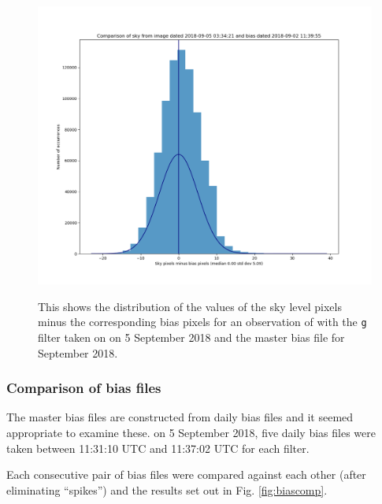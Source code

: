 \begin{figure}[!htbp]
\begin{center}
\includegraphics[scale=0.5]{images/negbiaseg.png}
\end{center}   
\caption{This shows the distribution of the values of the sky level pixels minus
the corresponding bias pixels for an observation of {\bstar} with the \texttt{g}
filter taken on on 5 September 2018 and the master bias file for September 2018.}
\protect\label{fig:negbiaseg}
\end{figure}

\subsubsection{Comparison of bias files}

The master bias files are constructed from daily bias files and it seemed
appropriate to examine these. on 5 September 2018, five daily bias files were
taken between 11:31:10 UTC and 11:37:02 UTC for each filter.

Each consecutive pair of bias files were compared against each other (after
eliminating ``spikes'') and the results set out in Fig.
\ref{fig:biascomp}.

